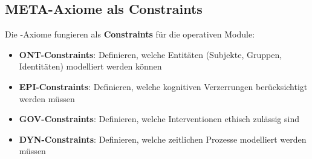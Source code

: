 \subsection{META-Axiome als Constraints}

Die \META-Axiome fungieren als \textbf{Constraints} für die operativen Module:

\begin{itemize}
    \item \textbf{ONT-Constraints}: Definieren, welche Entitäten (Subjekte, Gruppen, Identitäten) modelliert werden können
    \item \textbf{EPI-Constraints}: Definieren, welche kognitiven Verzerrungen berücksichtigt werden müssen
    \item \textbf{GOV-Constraints}: Definieren, welche Interventionen ethisch zulässig sind
    \item \textbf{DYN-Constraints}: Definieren, welche zeitlichen Prozesse modelliert werden müssen
\end{itemize}

